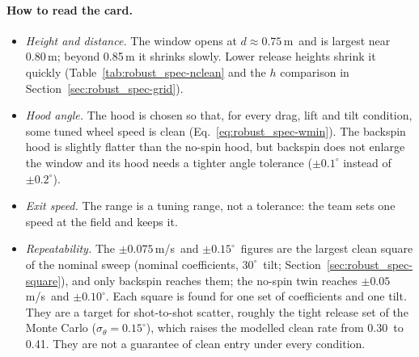 \paragraph{How to read the card.}
\begin{itemize}
  \item \emph{Height and distance.}
    The window opens at $d\approx0.75$\,\unit{m}\predicted\ and is largest near 0.80\,\unit{m}\predicted;
    beyond 0.85\,\unit{m} it shrinks slowly.
    Lower release heights shrink it quickly (Table~\ref{tab:robust_spec-nclean} and the $h$ comparison in
    Section~\ref{sec:robust_spec-grid}).
  \item \emph{Hood angle.}
    The hood is chosen so that, for every drag, lift and tilt condition, some tuned wheel speed is clean
    (Eq.~\eqref{eq:robust_spec-wmin}).
    The backspin hood is slightly flatter than the no-spin hood, but backspin does not enlarge the
    window and its hood needs a tighter angle tolerance ($\pm0.1^\circ$ instead of $\pm0.2^\circ$).
  \item \emph{Exit speed.}
    The range is a tuning range, not a tolerance: the team sets one speed at the field and keeps it.
  \item \emph{Repeatability.}
    The $\pm0.075$\,\unit{m/s}\predicted\ and $\pm0.15^\circ$\predicted\ figures are the largest clean
    square of the nominal sweep (nominal coefficients, $30^\circ$\confirmed\ tilt;
    Section~\ref{sec:robust_spec-square}), and only backspin reaches them; the no-spin twin reaches
    $\pm0.05$\,\unit{m/s}\predicted\ and $\pm0.10^\circ$\predicted.
    Each square is found for one set of coefficients and one tilt.
    They are a target for shot-to-shot scatter, roughly the tight release set of the Monte Carlo
    ($\sigma_\theta=0.15^\circ$\assumed), which raises the modelled clean rate from 0.30\predicted\ to
    0.41\predicted.
    They are not a guarantee of clean entry under every condition.
\end{itemize}

